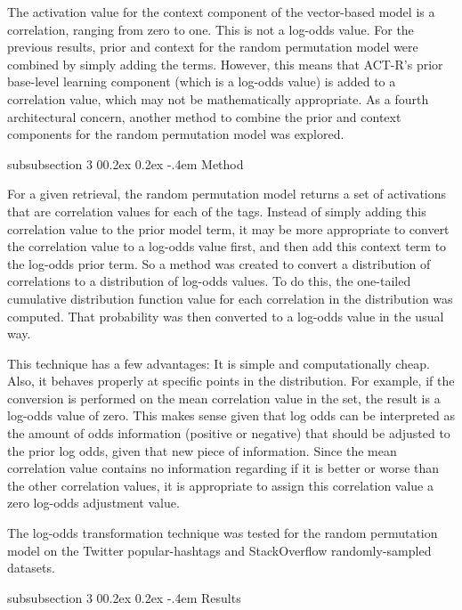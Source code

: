 \documentclass[man,donotrepeattitle]{apa6}
\makeatletter
\renewcommand{\subsubsection}{%
  \@startsection
  {subsubsection}%
  {3}%
  {\parindent}%
  {0\baselineskip \@plus 0.2ex \@minus 0.2ex}%
  {-.4em}%
  {\normalfont\normalsize\bfseries\addperi}}
\makeatother
\begin{document}
The activation value for the context component of the vector-based model is a correlation, ranging from zero to one.
This is not a log-odds value.
For the previous results, prior and context for the random permutation model were combined by simply adding the terms.
However, this means that ACT-R's prior base-level learning component (which is a log-odds value) is added to a correlation value, which may not be mathematically appropriate.
As a fourth architectural concern, another method to combine the prior and context components for the random permutation model was explored.

\subsubsection{Method}

For a given retrieval, the random permutation model returns a set of activations that are correlation values for each of the tags.
Instead of simply adding this correlation value to the prior model term, it may be more appropriate to convert the correlation value to a log-odds value first, and then add this context term to the log-odds prior term.
So a method was created to convert a distribution of correlations to a distribution of log-odds values.
To do this, the one-tailed cumulative distribution function value for each correlation in the distribution was computed.
That probability was then converted to a log-odds value in the usual way. 

This technique has a few advantages: 
It is simple and computationally cheap.
Also, it behaves properly at specific points in the distribution.
For example, if the conversion is performed on the mean correlation value in the set, the result is a log-odds value of zero.
This makes sense given that log odds can be interpreted as the amount of odds information (positive or negative) that should be adjusted to the prior log odds, given that new piece of information.
Since the mean correlation value contains no information regarding if it is better or worse than the other correlation values, it is appropriate to assign this correlation value a zero log-odds adjustment value.

The log-odds transformation technique was tested for the random permutation model on the Twitter popular-hashtags and StackOverflow randomly-sampled datasets.

\subsubsection{Results}
\end{document}
